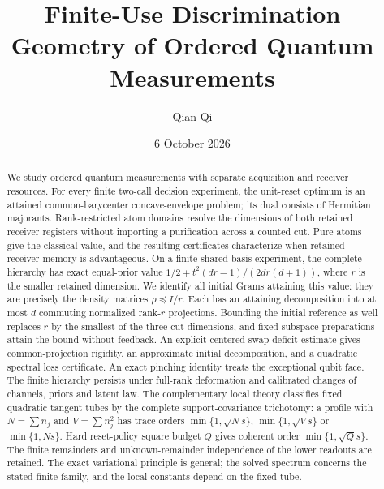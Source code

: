\documentclass[11pt]{amsart}
\title[Finite-use discrimination geometry]{Finite-Use Discrimination Geometry of Ordered Quantum Measurements}
\author{Qian Qi}
\date{6 October 2026}
\numberwithin{equation}{section}
\theoremstyle{definition}\newtheorem{definition}[theorem]{Definition}
\theoremstyle{remark}\newtheorem{remark}[theorem]{Remark}
\begin{document}
\raggedbottom
\begin{abstract}
We study ordered quantum measurements with separate acquisition and
receiver resources.  For every finite two-call decision experiment,
the unit-reset optimum is an attained common-barycenter concave-envelope
problem; its dual consists of Hermitian majorants.  Rank-restricted
atom domains resolve the dimensions of both retained receiver registers
without importing a purification across a counted cut.  Pure atoms give
the classical value, and the resulting certificates characterize when
retained receiver memory is advantageous.
On a finite shared-basis experiment, the complete hierarchy has exact
equal-prior value $1/2+t^2(dr-1)/(2dr(d+1))$, where $r$ is the smaller
retained dimension.  We identify all initial Grams attaining this
value: they are precisely the density matrices $\rho\preceq I/r$.
Each has an attaining decomposition into at most $d$ commuting
normalized rank-$r$ projections.  Bounding the initial reference as
well replaces $r$ by the smallest of the three cut dimensions, and
fixed-subspace preparations attain the bound without feedback.
An explicit centered-swap deficit estimate gives common-projection
rigidity, an approximate initial decomposition, and a quadratic
spectral loss certificate.  An exact pinching identity treats the
exceptional qubit face.  The finite hierarchy persists under full-rank
deformation and calibrated changes of channels, priors and latent law.
The complementary local theory classifies fixed quadratic tangent
tubes by the complete support-covariance trichotomy: a profile with
$N=\sum n_j$ and $V=\sum n_j^2$ has trace orders
$\min\{1,\sqrt Ns\}$, $\min\{1,\sqrt Vs\}$ or $\min\{1,Ns\}$.
Hard reset-policy square budget $Q$ gives coherent order
$\min\{1,\sqrt Qs\}$.  The finite remainders and unknown-remainder
independence of the lower readouts are retained.  The exact variational
principle is general; the solved spectrum concerns the stated finite
family, and the local constants depend on the fixed tube.
\end{abstract}
\maketitle





















\end{document}
